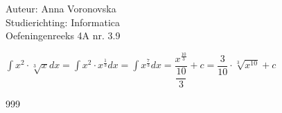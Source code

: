 \documentclass[a4paper]{article}
\begin{document}
\noindent \large Auteur: Anna Voronovska \\
\noindent \large Studierichting: Informatica \\
\noindent \large Oefeningenreeks 4A nr. 3.9 \\

\medskip

\normalsize
$
\displaystyle\int x^2 \cdot \sqrt[3]{x} dx = \displaystyle\int x^2 \cdot x^{\tfrac{1}{3}} dx = \displaystyle\int x^{\tfrac{7}{3}} dx = \dfrac{x^{\tfrac{10}{3}}}{\dfrac{10}{3}} + c = \dfrac{3}{10} \cdot \sqrt[3]{x^{10}} + c$


\begin{thebibliography}{999}
\end{thebibliography}
\end{document}
